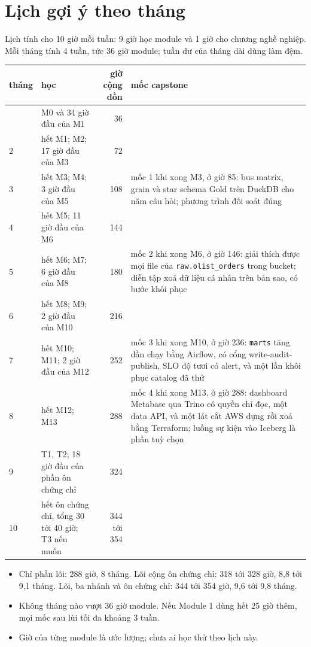 \documentclass[11pt,a4paper,oneside]{report}
\newcommand{\thd}[1]{\textbf{\sffamily\small #1}}
\newcommand{\code}[1]{\texttt{#1}}
\begin{document}
\section{Lịch gợi ý theo tháng}
Lịch tính cho 10 giờ mỗi tuần: 9 giờ học module và 1 giờ cho chương nghề nghiệp. Mỗi tháng tính 4 tuần, tức 36 giờ module; tuần dư của tháng dài dùng làm đệm.

\begin{xltabular}{\textwidth}{@{}l P{3.8cm} r L@{}}
\toprule
\thd{tháng} & \thd{học} & \thd{giờ cộng dồn} & \thd{mốc capstone} \\
\midrule
\endhead
\bottomrule
{} & M0 và 34 giờ đầu của M1 & 36 & \\
2 & hết M1; M2; 17 giờ đầu của M3 & 72 & \\
3 & hết M3; M4; 3 giờ đầu của M5 & 108 & mốc 1 khi xong M3, ở giờ 85: bus matrix, grain và star schema Gold trên DuckDB cho năm câu hỏi; phương trình đối soát đúng \\
4 & hết M5; 11 giờ đầu của M6 & 144 & \\
5 & hết M6; M7; 6 giờ đầu của M8 & 180 & mốc 2 khi xong M6, ở giờ 146: giải thích được mọi file của \code{raw.olist\_\allowbreak{}orders} trong bucket; diễn tập xoá dữ liệu cá nhân trên bản sao, có bước khôi phục \\
6 & hết M8; M9; 2 giờ đầu của M10 & 216 & \\
7 & hết M10; M11; 2 giờ đầu của M12 & 252 & mốc 3 khi xong M10, ở giờ 236: \code{marts} tăng dần chạy bằng Airflow, có cổng write-audit-publish, SLO độ tươi có alert, và một lần khôi phục catalog đã thử \\
8 & hết M12; M13 & 288 & mốc 4 khi xong M13, ở giờ 288: dashboard Metabase qua Trino có quyền chỉ đọc, một data API, và một lát cắt AWS dựng rồi xoá bằng Terraform; luồng sự kiện vào Iceberg là phần tuỳ chọn \\
9 & T1, T2; 18 giờ đầu của phần ôn chứng chỉ & 324 & \\
10 & hết ôn chứng chỉ, tổng 30 tới 40 giờ; T3 nếu muốn & 344 tới 354 & \\
\end{xltabular}
\begin{itemize}
  \item Chỉ phần lõi: 288 giờ, 8 tháng. Lõi cộng ôn chứng chỉ: 318 tới 328 giờ, 8,8 tới 9,1 tháng. Lõi, ba nhánh và ôn chứng chỉ: 344 tới 354 giờ, 9,6 tới 9,8 tháng.
  \item Không tháng nào vượt 36 giờ module. Nếu Module 1 dùng hết 25 giờ thêm, mọi mốc sau lùi tối đa khoảng 3 tuần.
  \item Giờ của từng module là ước lượng; chưa ai học thử theo lịch này.
\end{itemize}
\end{document}
